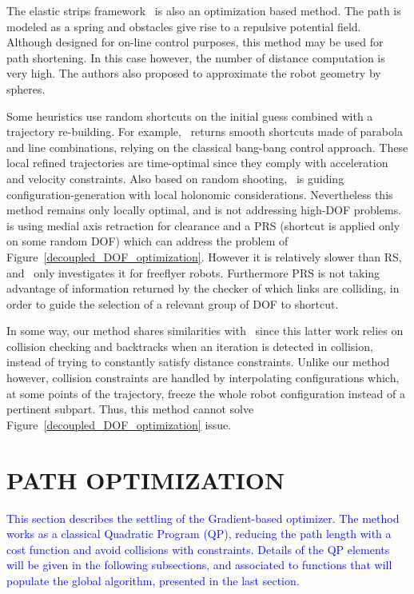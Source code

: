 \documentclass{tADR2e}
\begin{document}
The elastic strips framework~\cite{BrockElasticStrips} is also an optimization 
based method. The path is modeled as a spring and obstacles give rise to a 
repulsive potential field. Although designed for on-line control purposes, this 
method may be used for path shortening. In this case however, the number of 
distance computation is very high. The authors also proposed to approximate the 
robot geometry by spheres.

Some heuristics use random shortcuts on the initial guess combined with a 
trajectory re-building. For example,~\cite{HauserFastSmooth} returns smooth shortcuts made of parabola and line combinations, relying on the classical bang-bang control approach. These local refined trajectories 
are time-optimal since they comply with acceleration and velocity constraints. 
Also based on random shooting,~\cite{Guernane2011} is guiding 
configuration-generation with local holonomic considerations. 
Nevertheless this method remains only 
locally optimal, and is not addressing high-DOF 
problems.~\cite{GeraertsIJRR07} is 
using medial axis retraction for clearance and a PRS (shortcut is applied only 
on some random DOF) 
which can address the problem of Figure~\ref{decoupled_DOF_optimization}. 
However it is 
relatively slower than RS, and~\cite{GeraertsIJRR07} only investigates 
it for freeflyer robots. 
Furthermore PRS is not taking advantage of information returned by 
the checker of which links are colliding, in order to guide the selection of a relevant group of DOF to shortcut.

In some way, our method shares similarities with~\cite{PanSmoothSplineShort} 
since this latter work relies on collision checking and backtracks when an 
iteration is detected in collision, instead of trying to constantly satisfy 
distance constraints. Unlike our method however, collision constraints are 
handled by interpolating configurations which, at some points of the trajectory, 
freeze the whole robot configuration instead of a pertinent subpart. Thus, this 
method cannot solve Figure~\ref{decoupled_DOF_optimization} issue.


\section{PATH OPTIMIZATION} \label{section:path_optim}

\textcolor{blue}{This section describes the settling of the Gradient-based optimizer. The method works as a classical Quadratic Program (QP), reducing the path length with a cost function and avoid collisions with constraints. Details of the QP elements will be given in the following subsections, and associated to functions that will populate the global algorithm, presented in the last section.}
\end{document}
